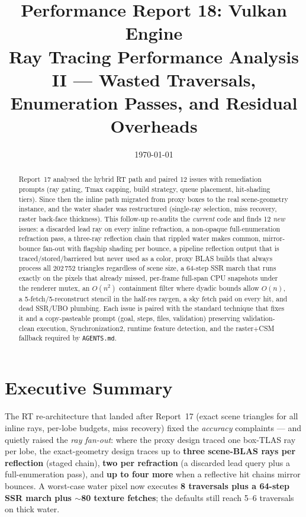 \documentclass[11pt,a4paper]{article}
\title{Performance Report 18: Vulkan Engine \\
\large Ray Tracing Performance Analysis II --- Wasted Traversals, Enumeration Passes, and Residual Overheads}
\author{}
\date{\today}
\begin{document}
\maketitle

\begin{abstract}
Report~17 analysed the hybrid RT path and paired 12 issues with remediation prompts (ray gating, Tmax capping, build strategy, queue placement, hit-shading tiers). Since then the inline path migrated from proxy boxes to the real scene-geometry instance, and the water shader was restructured (single-ray selection, miss recovery, raster back-face thickness). This follow-up re-audits the \emph{current} code and finds 12 \emph{new} issues: a discarded lead ray on every inline refraction, a non-opaque full-enumeration refraction pass, a three-ray reflection chain that rippled water makes common, mirror-bounce fan-out with flagship shading per bounce, a pipeline reflection output that is traced/stored/barriered but never used as a color, proxy BLAS builds that always process all 202\,752 triangles regardless of scene size, a 64-step SSR march that runs exactly on the pixels that already missed, per-frame full-span CPU snapshots under the renderer mutex, an $O(n^2)$ containment filter where dyadic bounds allow $O(n)$, a 5-fetch/5-reconstruct stencil in the half-res raygen, a sky fetch paid on every hit, and dead SSR/UBO plumbing. Each issue is paired with the standard technique that fixes it and a copy-pasteable prompt (goal, steps, files, validation) preserving validation-clean execution, Synchronization2, runtime feature detection, and the raster$+$CSM fallback required by \texttt{AGENTS.md}.
\end{abstract}

\tableofcontents
\newpage

\section{Executive Summary}

The RT re-architecture that landed after Report~17 (exact scene triangles for all inline rays, per-lobe budgets, miss recovery) fixed the \textit{accuracy} complaints --- and quietly raised the \textit{ray fan-out}: where the proxy design traced one box-TLAS ray per lobe, the exact-geometry design traces up to \textbf{three scene-BLAS rays per reflection} (staged chain), \textbf{two per refraction} (a discarded lead query plus a full-enumeration pass), and \textbf{up to four more} when a reflective hit chains mirror bounces. A worst-case water pixel now executes \textbf{8 traversals plus a 64-step SSR march plus $\sim$80 texture fetches}; the defaults still reach 5--6 traversals on thick water.
\end{document}
